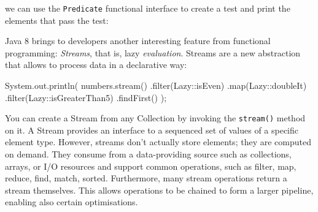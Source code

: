 \documentclass[12pt,a4paper,oneside,openright]{book}
\newenvironment{Shaded}{\begin{snugshade}}{\end{snugshade}}
\newcommand{\KeywordTok}[1]{\textcolor[rgb]{0.13,0.29,0.53}{\textbf{{#1}}}}
\newcommand{\DecValTok}[1]{\textcolor[rgb]{0.00,0.00,0.81}{{#1}}}
\newcommand{\StringTok}[1]{\textcolor[rgb]{0.31,0.60,0.02}{{#1}}}
\newcommand{\FunctionTok}[1]{\textcolor[rgb]{0.00,0.00,0.00}{{#1}}}
\newcommand{\NormalTok}[1]{{#1}}
\begin{document}
we can use the \texttt{Predicate} functional interface to create a test
and print the elements that pass the test:

\begin{Shaded}
\end{Shaded}

Java 8 brings to developers another interesting feature from functional
programming: \emph{Streams}, that is, lazy \emph{evaluation}. Streams
are a new abstraction that allows to process data in a declarative way:

\begin{Shaded}
\begin{Highlighting}[]
    \NormalTok{System.}\FunctionTok{out}\NormalTok{.}\FunctionTok{println}\NormalTok{(}
        \NormalTok{numbers.}\FunctionTok{stream}\NormalTok{()}
            \NormalTok{.}\FunctionTok{filter}\NormalTok{(Lazy::isEven)}
            \NormalTok{.}\FunctionTok{map}\NormalTok{(Lazy::doubleIt)}
            \NormalTok{.}\FunctionTok{filter}\NormalTok{(Lazy::isGreaterThan5)}
            \NormalTok{.}\FunctionTok{findFirst}\NormalTok{()}
    \NormalTok{);}
\end{Highlighting}
\end{Shaded}

You can create a Stream from any Collection by invoking the
\texttt{stream()} method on it. A Stream provides an interface to a
sequenced set of values of a specific element type. However, streams
don't actually store elements; they are computed on demand. They consume
from a data-providing source such as collections, arrays, or I/O
resources and support common operations, such as filter, map, reduce,
find, match, sorted. Furthermore, many stream operations return a stream
themselves. This allows operations to be chained to form a larger
pipeline, enabling also certain optimisations.
\end{document}
